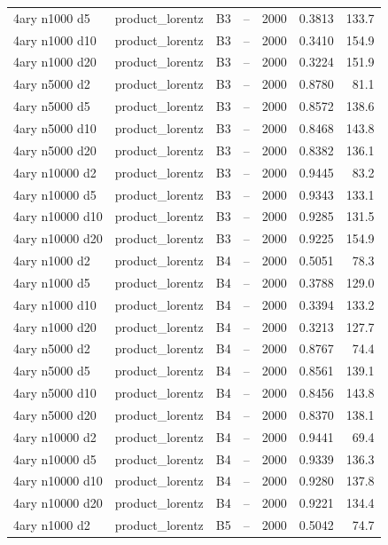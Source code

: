 \begin{longtable}{llllrrr}
4ary n1000 d5 & product\_lorentz & B3 & -- & 2000 & 0.3813 & 133.7 \\
4ary n1000 d10 & product\_lorentz & B3 & -- & 2000 & 0.3410 & 154.9 \\
4ary n1000 d20 & product\_lorentz & B3 & -- & 2000 & 0.3224 & 151.9 \\
4ary n5000 d2 & product\_lorentz & B3 & -- & 2000 & 0.8780 & 81.1 \\
4ary n5000 d5 & product\_lorentz & B3 & -- & 2000 & 0.8572 & 138.6 \\
4ary n5000 d10 & product\_lorentz & B3 & -- & 2000 & 0.8468 & 143.8 \\
4ary n5000 d20 & product\_lorentz & B3 & -- & 2000 & 0.8382 & 136.1 \\
4ary n10000 d2 & product\_lorentz & B3 & -- & 2000 & 0.9445 & 83.2 \\
4ary n10000 d5 & product\_lorentz & B3 & -- & 2000 & 0.9343 & 133.1 \\
4ary n10000 d10 & product\_lorentz & B3 & -- & 2000 & 0.9285 & 131.5 \\
4ary n10000 d20 & product\_lorentz & B3 & -- & 2000 & 0.9225 & 154.9 \\
4ary n1000 d2 & product\_lorentz & B4 & -- & 2000 & 0.5051 & 78.3 \\
4ary n1000 d5 & product\_lorentz & B4 & -- & 2000 & 0.3788 & 129.0 \\
4ary n1000 d10 & product\_lorentz & B4 & -- & 2000 & 0.3394 & 133.2 \\
4ary n1000 d20 & product\_lorentz & B4 & -- & 2000 & 0.3213 & 127.7 \\
4ary n5000 d2 & product\_lorentz & B4 & -- & 2000 & 0.8767 & 74.4 \\
4ary n5000 d5 & product\_lorentz & B4 & -- & 2000 & 0.8561 & 139.1 \\
4ary n5000 d10 & product\_lorentz & B4 & -- & 2000 & 0.8456 & 143.8 \\
4ary n5000 d20 & product\_lorentz & B4 & -- & 2000 & 0.8370 & 138.1 \\
4ary n10000 d2 & product\_lorentz & B4 & -- & 2000 & 0.9441 & 69.4 \\
4ary n10000 d5 & product\_lorentz & B4 & -- & 2000 & 0.9339 & 136.3 \\
4ary n10000 d10 & product\_lorentz & B4 & -- & 2000 & 0.9280 & 137.8 \\
4ary n10000 d20 & product\_lorentz & B4 & -- & 2000 & 0.9221 & 134.4 \\
\rowcolor{oursbg}
4ary n1000 d2 & product\_lorentz & B5 & -- & 2000 & 0.5042 & 74.7 \\

\end{longtable}
